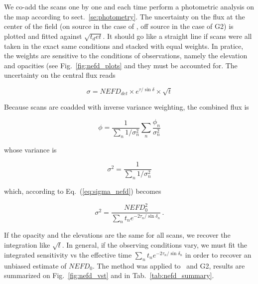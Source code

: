 We co-add the scans one by one and each time perform a photometric analysis on
the map according to sect.~\ref{se:photometry}. The uncertainty on the flux at
the center of the field (on source in the case of \hls, off source in the case
of G2) is plotted and fitted against $\sqrt{t_det}$. It should go like a
straight line if scans were all taken in the exact same conditions and stacked
with equal weights. In pratice, the weights are sensitive to the conditions of
observations, namely the elevation and opacities (see Fig.~\ref{fig:nefd_plots}
and they must be accounted for. The uncertainty on the central flux reads

\begin{equation}
\sigma = NEFD_{det}\times e^{\tau/\sin\delta}\times\sqrt{t}
\label{eq:sigma_nefd}
\end{equation}

Because scans are coadded with inverse variance weighting, the combined flux is

\begin{equation}
\phi = \frac{1}{\sum_n 1/\sigma_n^2}\sum_n\frac{\phi_n}{\sigma_n^2}
\end{equation}

whose variance is

\begin{equation}
\sigma^2 = \frac{1}{\sum_n 1/\sigma_n^2}
\end{equation}

which, according to Eq.~(\ref{eq:sigma_nefd}) becomes

\begin{equation}
\sigma^2 = \frac{NEFD_0^2}{\sum_{n}t_n e^{-2\tau_n/\sin\delta_n}}\,.
\label{eq:sigma_tau_w8}
\end{equation}

If the opacity and the elevations are the same for all scans, we recover the
integration like $\sqrt{t}$. In general, if the observing conditions vary, we
must fit the integrated sensitivity vs the effective time $\sum_{n}t_n
e^{-2\tau_n/\sin\delta_n}$ in order to recover an unbiased estimate of
$NEFD_0$. The method was applied to \hls\ and G2, results are summarized on
Fig.~\ref{fig:nefd_vst} and in Tab.~\ref{tab:nefd_summary}.


